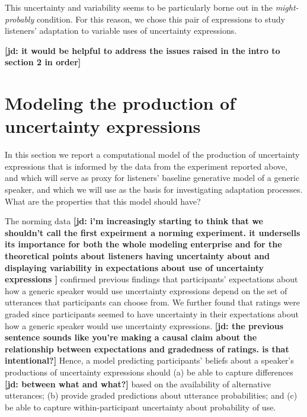 \documentclass[lucida,biblatex]{sp} %
\newcommand{\jd}[1]{\textcolor{PinkyPurple}{\textbf{[jd: #1]}}}
\newcommand{\sectionref}[1]{Section~\ref{#1}}
\begin{document}
This uncertainty and variability seems to be particularly borne out in the \emph{might-probably} condition. For this reason, we chose this pair of expressions
to study listeners' adaptation to variable uses of uncertainty expressions.

\jd{it would be helpful to address the issues raised in the intro to section 2 in order}


\section{Modeling the production of uncertainty expressions}
\label{sec:model-baseline}


In this section we report a computational model of the production of uncertainty expressions that is informed by the data from the experiment reported above, and which will serve as proxy for listeners' baseline generative model of a generic speaker, and which we will use as the basis for investigating adaptation processes. What are the properties that this model should have?

The norming data \jd{i'm increasingly starting to think that we shouldn't call the first expeirment a norming experiment. it undersells its importance for both the whole modeling enterprise and for the theoretical points about listeners having uncertainty about and displaying variability in expectations about use of uncertainty expressions } confirmed previous findings that participants' expectations 
about how a generic speaker would use uncertainty expressions 
depend on the set of utterances that participants can choose from.
We further found that ratings were graded since participants seemed to have uncertainty
in their expectations about how a generic speaker would use uncertainty expressions. \jd{the previous sentence sounds like you're making a causal claim about the relationship between expectations and gradedness of ratings. is that intentional?}
Hence, a model predicting participants' beliefs about a speaker's productions of uncertainty expressions
 should  (a) be able to capture differences \jd{between what and what?} based on the availability of alternative utterances; 
(b) provide graded predictions about utterance probabilities; 
and (c) be able to capture within-participant uncertainty about probability of use.
\end{document}

